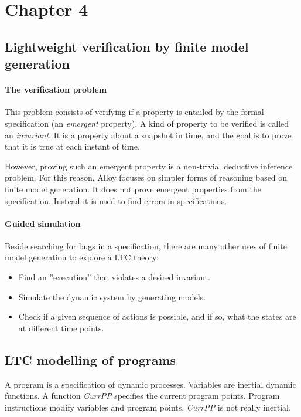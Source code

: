 \documentclass[10pt,a4paper]{article}
\theoremstyle{definition}
\begin{document}
\section{Chapter 4}

\subsection{Lightweight verification by finite model generation}

\paragraph{The verification problem} This problem consists of verifying if a property is entailed by the formal specification (an \textit{emergent} property). A kind of property to be verified is called an \textit{invariant}. It is a property about a snapshot in time, and the goal is to prove that it is true at each instant of time.
	
However, proving such an emergent property is a non-trivial deductive inference problem. For this reason, Alloy focuses on simpler forms of reasoning based on finite model generation. It does not prove emergent properties from the specification. Instead it is used to find errors in specifications.

\paragraph{Guided simulation} Beside searching for bugs in a specification, there are many other uses
of finite model generation to explore a LTC theory:
\begin{itemize}
	\item Find an ”execution” that violates a desired invariant.
	\item Simulate the dynamic system by generating models.
	\item Check if a given sequence of actions is possible, and if so, what the states are at different time points.
	
\end{itemize}
\subsection{LTC modelling of programs}

A program is a specification of dynamic processes. Variables are inertial dynamic functions. A function \textit{CurrPP} specifies the current program points. Program instructions modify variables and program points. \textit{CurrPP} is not really inertial.
\end{document}
